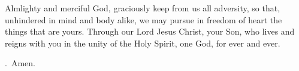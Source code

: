\lettrine[lines=3]{A}{}lmlighty and merciful God, graciously keep from us all adversity, so that, unhindered in mind and body alike, we may pursue in freedom of heart the things that are yours. Through our Lord Jesus Christ, your Son, who lives and reigns with you in the unity of the Holy Spirit, one God, for ever and ever. \par \Rbar.~Amen.   

